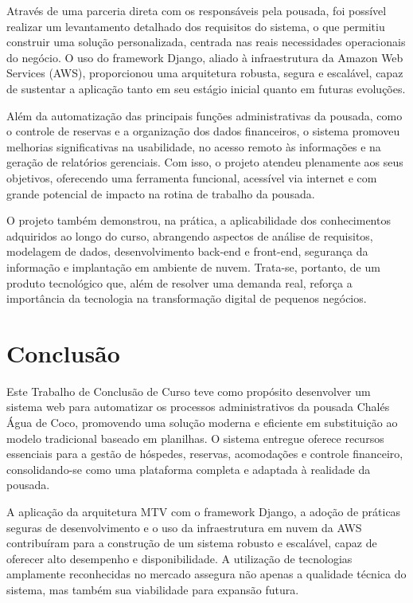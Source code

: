 \documentclass[
	12pt,				%
	openany,			%
	twoside,			%
	a4paper,			%
	english,			%
	french,				%
	spanish,			%
	brazil				%
	]{abntex2}
\begin{document}
Através de uma parceria direta com os responsáveis pela pousada, foi possível realizar um levantamento detalhado dos requisitos do sistema, o que permitiu construir uma solução personalizada, centrada nas reais necessidades operacionais do negócio. O uso do framework Django, aliado à infraestrutura da Amazon Web Services (AWS), proporcionou uma arquitetura robusta, segura e escalável, capaz de sustentar a aplicação tanto em seu estágio inicial quanto em futuras evoluções.

Além da automatização das principais funções administrativas da pousada, como o controle de reservas e a organização dos dados financeiros, o sistema promoveu melhorias significativas na usabilidade, no acesso remoto às informações e na geração de relatórios gerenciais. Com isso, o projeto atendeu plenamente aos seus objetivos, oferecendo uma ferramenta funcional, acessível via internet e com grande potencial de impacto na rotina de trabalho da pousada.

O projeto também demonstrou, na prática, a aplicabilidade dos conhecimentos adquiridos ao longo do curso, abrangendo aspectos de análise de requisitos, modelagem de dados, desenvolvimento back-end e front-end, segurança da informação e implantação em ambiente de nuvem. Trata-se, portanto, de um produto tecnológico que, além de resolver uma demanda real, reforça a importância da tecnologia na transformação digital de pequenos negócios.


%

\chapter{Conclusão}

Este Trabalho de Conclusão de Curso teve como propósito desenvolver um sistema web para automatizar os processos administrativos da pousada Chalés Água de Coco, promovendo uma solução moderna e eficiente em substituição ao modelo tradicional baseado em planilhas. O sistema entregue oferece recursos essenciais para a gestão de hóspedes, reservas, acomodações e controle financeiro, consolidando-se como uma plataforma completa e adaptada à realidade da pousada.

A aplicação da arquitetura MTV com o framework Django, a adoção de práticas seguras de desenvolvimento e o uso da infraestrutura em nuvem da AWS contribuíram para a construção de um sistema robusto e escalável, capaz de oferecer alto desempenho e disponibilidade. A utilização de tecnologias amplamente reconhecidas no mercado assegura não apenas a qualidade técnica do sistema, mas também sua viabilidade para expansão futura.
\end{document}
